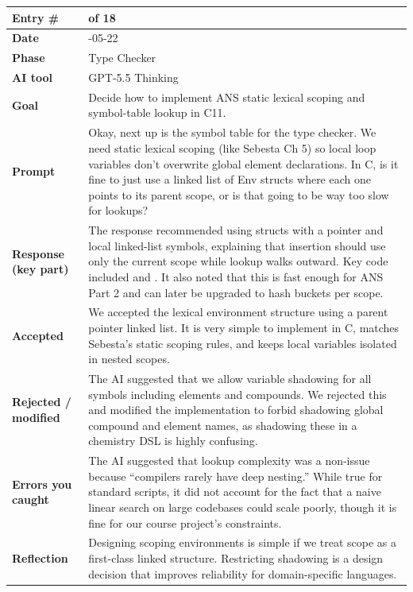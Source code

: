 \documentclass[11pt,a4paper]{article}
\newcommand{\code}[1]{\texttt{\detokenize{#1}}}
\newcommand{\entrygap}{\vspace{8pt}}
\newenvironment{journalentry}{%
  \begin{center}\small\renewcommand{\arraystretch}{1.22}%
  \begin{tabular}{|>{\columncolor{anscodebg}\bfseries}p{3.0cm}|>{\RaggedRight\arraybackslash}p{12.25cm}|}%
  \hline
}{%
  \end{tabular}\end{center}\entrygap
}
\begin{document}
\begin{journalentry}
Entry \# & 15 of 18 \\ \hline
Date & 2026-05-22 \\ \hline
Phase & Type Checker \\ \hline
AI tool & GPT-5.5 Thinking \\ \hline
Goal & Decide how to implement ANS static lexical scoping and symbol-table lookup in C11. \\ \hline
Prompt & Okay, next up is the symbol table for the type checker. We need static lexical scoping (like Sebesta Ch 5) so local loop variables don't overwrite global element declarations. In C, is it fine to just use a linked list of Env structs where each one points to its parent scope, or is that going to be way too slow for lookups? \\ \hline
Response (key part) & The response recommended using \code{Env} structs with a \code{parent} pointer and local linked-list symbols, explaining that insertion should use only the current scope while lookup walks outward. Key code included \code{Symbol *env\_lookup(Env *env, const char *name)} and \code{bool env\_define(Env *env, const char *name, SymbolKind kind, Type type)}. It also noted that this is fast enough for ANS Part 2 and can later be upgraded to hash buckets per scope. \\ \hline
Accepted & We accepted the lexical environment structure using a parent pointer linked list. It is very simple to implement in C, matches Sebesta's static scoping rules, and keeps local variables isolated in nested scopes. \\ \hline
Rejected / modified & The AI suggested that we allow variable shadowing for all symbols including elements and compounds. We rejected this and modified the implementation to forbid shadowing global compound and element names, as shadowing these in a chemistry DSL is highly confusing. \\ \hline
Errors you caught & The AI suggested that lookup complexity was a non-issue because ``compilers rarely have deep nesting.'' While true for standard scripts, it did not account for the fact that a naive linear search on large codebases could scale poorly, though it is fine for our course project's constraints. \\ \hline
Reflection & Designing scoping environments is simple if we treat scope as a first-class linked structure. Restricting shadowing is a design decision that improves reliability for domain-specific languages. \\ \hline
\end{journalentry}
\end{document}
